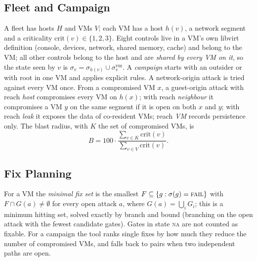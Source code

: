 \documentclass[conference]{IEEEtran}
\newcommand{\fail}{\textsc{fail}}
\newcommand{\na}{\textsc{na}}
\begin{document}
\subsection{Fleet and Campaign}
A fleet has hosts $H$ and VMs $V$; each VM has a host $h(v)$, a network segment and a criticality $\mathrm{crit}(v)\in\{1,2,3\}$. Eight controls live in a VM's own libvirt definition (console, devices, network, shared memory, cache) and belong to the VM; all other controls belong to the host and are \emph{shared by every VM on it}, so the state seen by $v$ is $\sigma_v=\sigma_{h(v)}\cup\sigma^{\mathrm{vm}}_v$. A \emph{campaign} starts with an outsider or with root in one VM and applies explicit rules. A network-origin attack is tried against every VM once. From a compromised VM $x$, a guest-origin attack with reach \emph{host} compromises every VM on $h(x)$; with reach \emph{neighbour} it compromises a VM $y$ on the same segment if it is open on both $x$ and $y$; with reach \emph{leak} it exposes the data of co-resident VMs; reach \emph{VM} records persistence only. The blast radius, with $K$ the set of compromised VMs, is
\begin{equation}
B=100\cdot\frac{\sum_{v\in K}\mathrm{crit}(v)}{\sum_{v\in V}\mathrm{crit}(v)} .
\end{equation}

\subsection{Fix Planning}
For a VM the \emph{minimal fix set} is the smallest $F\subseteq\{g:\sigma(g)=\fail\}$ with $F\cap G(a)\neq\emptyset$ for every open attack $a$, where $G(a)=\bigcup_i G_i$; this is a minimum hitting set, solved exactly by branch and bound (branching on the open attack with the fewest candidate gates). Gates in state \na{} are not counted as fixable. For a campaign the tool ranks single fixes by how much they reduce the number of compromised VMs, and falls back to pairs when two independent paths are open.
\end{document}
